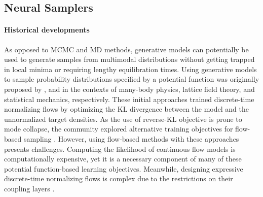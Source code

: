 \documentclass[]{fairmeta}
\theoremstyle{remark}
\begin{document}


\subsection{Neural Samplers}
\label{sec:neural_samplers}

\paragraph{Historical developments}
As opposed to MCMC and MD methods, generative models can potentially be used to generate samples from multimodal distributions without getting trapped in local minima or requiring lengthy equilibration times. Using generative models to sample probability distributions specified by a potential function was originally proposed by \cite{noe2019boltzmann,albergo2019flow}, and \cite{nicoli2020asymptotically} in the contexts of many-body physics, lattice field theory, and statistical mechanics, respectively.
These initial approaches trained discrete-time normalizing flows \citep{tabak2013family} by optimizing the KL divergence between the model and the unnormalized target densities. As the use of reverse-KL objective is prone to mode collapse, the community explored alternative training objectives for flow-based sampling \citep{vaitl2022gradients,midgley2022flow,mate2023learning}. 
However, using flow-based methods with these approaches presents challenges. Computing the likelihood of continuous flow models \citep{chen2018neural} is computationally expensive, yet it is a necessary component of many of these potential function-based learning objectives. Meanwhile, designing expressive discrete-time normalizing flows is complex due to the restrictions on their coupling layers \citep{dinh2016density,midgley2023se}.
\end{document}
